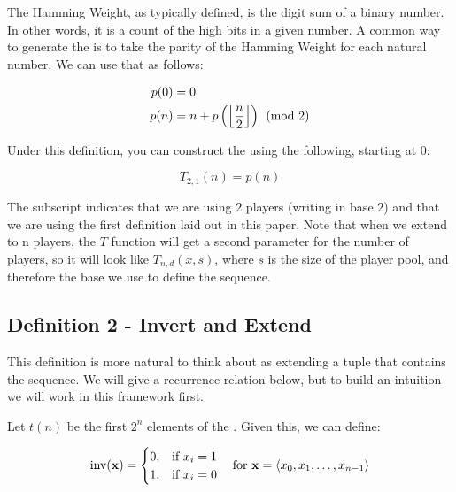 \documentclass[conference]{IEEEtran}
\begin{document}
The Hamming Weight, as typically defined, is the digit sum of a binary number. In other words, it is a count of the high bits in a given number. A common way to generate the \TMS is to take the parity of the Hamming Weight for each natural number. We can use that as follows:

\begin{equation}
    \begin{aligned}
        p(0) &= 0 \\
        p(n) &= n + p\left(\left\lfloor \dfrac{n}{2} \right\rfloor\right) \pmod{2}
    \end{aligned}
\end{equation}

Under this definition, you can construct the \TMS using the following, starting at $0$:

\begin{equation}
    \label{eq:p2d01}
    T_{2,1}(n) = p(n)
\end{equation}

The subscript indicates that we are using $2$ players (writing in base $2$) and that we are using the first definition laid out in this paper. Note that when we extend to n players, the $T$ function will get a second parameter for the number of players, so it will look like $T_{n,d}(x, s)$, where $s$ is the size of the player pool, and therefore the base we use to define the sequence.

\subsection{Definition 2 - Invert and Extend}


This definition is more natural to think about as extending a tuple that contains the sequence. We will give a recurrence relation below, but to build an intuition we will work in this framework first.

Let $t(n)$ be the first $2^n$ elements of the \TMS. Given this, we can define:

\begin{equation}
    \text{inv}(\mathbf{x}) = \begin{cases}
        0, & \text{if } x_i = 1 \\
        1, & \text{if } x_i = 0
    \end{cases} \quad \text{for } \mathbf{x} = \langle x_0, x_1, \ldots, x_{n-1} \rangle
\end{equation}
\end{document}
